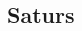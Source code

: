 \renewcommand{\contentsname}{}
\renewcommand{\cftsecfont}{}
\renewcommand{\cftsecpagefont}{}
\renewcommand{\cftsecleader}{\cftdotfill{\cftdotsep}}
\setlength{\cftbeforesecskip}{0pt}
\begin{spacing}{1.25}
    \section*{Saturs}
    \tableofcontents
\end{spacing}
